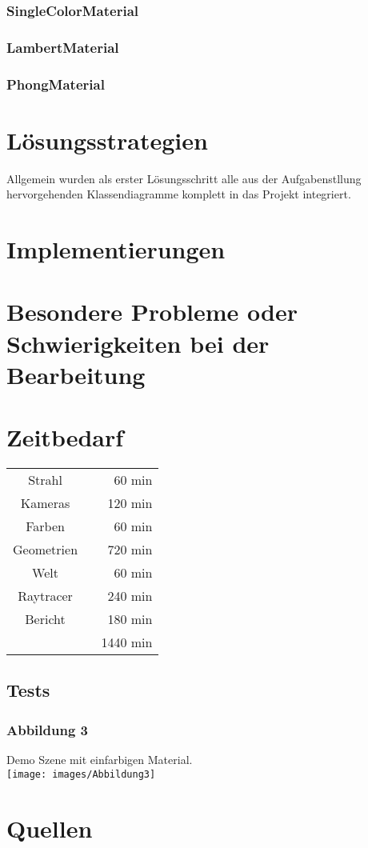 \documentclass[14pt]{extarticle}
\begin{document}
\subsubsection{SingleColorMaterial}
\subsubsection{LambertMaterial}
\subsubsection{PhongMaterial}


\section{Lösungsstrategien}
Allgemein wurden als erster Lösungsschritt alle aus der Aufgabenstllung hervorgehenden Klassendiagramme komplett in das Projekt integriert.


\section{Implementierungen}




\section{Besondere Probleme oder Schwierigkeiten bei der Bearbeitung}



\section{Zeitbedarf}
\begin{center}
\begin{tabular}{cr}
Strahl	  \	&60 min	\\
Kameras 	\	&120 min	\\
Farben \	&60 min	\\
Geometrien \	&720 min	\\
Welt \	&60 min	\\
Raytracer \	&240 min	\\
Bericht  \		&180 min	 \\
	\hline
	&1440 min
\end{tabular}
\end{center}

\subsection{Tests}
\subsubsection{Abbildung 3}
Demo Szene mit einfarbigen Material.\\
\texttt{[image: images/Abbildung3]}\\



\section{Quellen}
\end{document}
